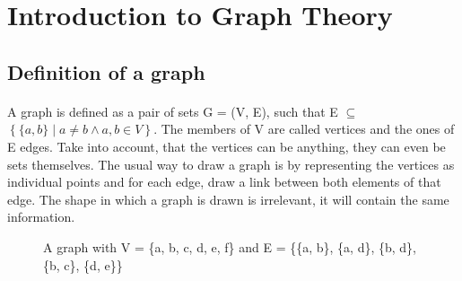 \section{Introduction to Graph Theory}

\subsection{Definition of a graph}
\paragraph{}
A graph is defined as a pair of sets G = (V, E), such that E $\subseteq$ $\left\{\{a, b\} \mid a \neq b \wedge a,b \in V\right\}$. The members of V are called vertices and the ones of E edges. Take into account, that the vertices can be anything, they can even be sets themselves. The usual way to draw a graph is by representing the vertices as individual points and for each edge, draw a link between both elements of that edge. The shape in which a graph is drawn is irrelevant, it will contain the same information.

\begin{figure}[h]

\caption{A graph with V = \{a, b, c, d, e, f\} and E = \{\{a, b\}, \{a, d\}, \{b, d\}, \{b, c\}, \{d, e\}\}}
\end{figure}

